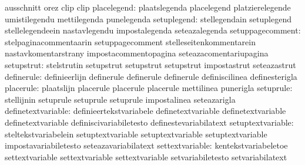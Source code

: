                                   ausschnitt                       orez
                                  clip                             clip
                     placelegend: plaatslegenda                    placelegend
                                  platzierelegende                 umistilegendu
                                  mettilegenda                     punelegenda
                     setuplegend: stellegendain                    setuplegend
                                  stellelegendeein                 nastavlegendu
                                  impostalegenda                   seteazalegenda
                setuppagecomment: stelpaginacommentaarin           setuppagecomment
                                  stelleseitenkommentarein         nastavkomentarstrany
                                  impostacommentopagina            seteazacomentariupagina
                      setupstrut: stelstrutin                      setupstrut
                                  setupstrut                       setupstrut
                                  impostastrut                     seteazastrut
                      definerule: definieerlijn                    definerule
                                  definerule                       definerule
                                  definiscilinea                   definesterigla
                       placerule: plaatslijn                       placerule
                                  placerule                        placerule
                                  mettilinea                       punerigla
                       setuprule: stellijnin                       setuprule
                                  setuprule                        setuprule
                                  impostalinea                     seteazarigla
              definetextvariable: definieertekstvariabele          definetextvariable
                                  definetextvariable               definetextvariable
                                  definiscivariabiletesto          definestevariabilatext
               setuptextvariable: steltekstvariabelein             setuptextvariable
                                  setuptextvariable                setuptextvariable
                                  impostavariabiletesto            seteazavariabilatext
                 settextvariable: kentekstvariabeletoe             settextvariable
                                  settextvariable                  settextvariable
                                  setvariabiletesto                setvariabilatext %
